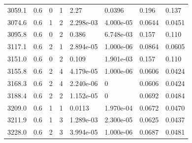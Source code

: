 \documentclass[preview]{standalone}
\begin{document}
{{{{{\begin{tabular}{L{1.2cm}C{1.2cm} C{0.3cm}C{0.5cm} C{1.4cm}C{1.4cm} C{1.4cm}C{1.4cm}}
  3059.1  &   0.6  & 0     &  1 &  2.27  & 0.0396  & 0.196 &  0.137   \\ 
  3074.6  &   0.6  & 1     &  2 &  2.298e-03  & 4.000e-05  & 0.0644 &  0.0451   \\ 
  3095.8  &   0.6  & 0     &  2 &  0.386  & 6.748e-03  & 0.157 &  0.110   \\ 
  3117.1  &   0.6  & 2     &  1 &  2.894e-05  & 1.000e-06  & 0.0864 &  0.0605   \\ 
  3151.0  &   0.6  & 0     &  2 &  0.109  & 1.901e-03  & 0.157 &  0.110   \\ 
  3155.8  &   0.6  & 2     &  4 &  4.179e-05  & 1.000e-06  & 0.0606 &  0.0424   \\ 
  3168.3  &   0.6  & 2     &  4 &  2.240e-06  & 0  & 0.0606 &  0.0424   \\ 
  3188.4  &   0.6  & 2     &  2 &  1.152e-05  & 0  & 0.0692 &  0.0484   \\ 
  3209.0  &   0.6  & 1     &  1 &  0.0113  & 1.970e-04  & 0.0672 &  0.0470   \\ 
  3211.9  &   0.6  & 1     &  3 &  1.289e-03  & 2.300e-05  & 0.0625 &  0.0437   \\ 
  3228.0  &   0.6  & 2     &  3 &  3.994e-05  & 1.000e-06  & 0.0687 &  0.0481   \\ 
\hline 
\end{tabular} 

}}}}}
\end{document}
